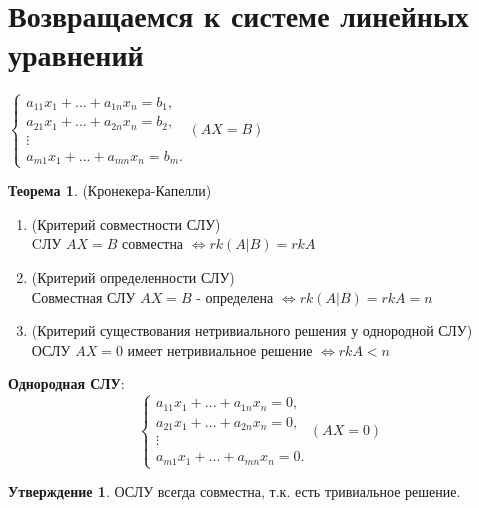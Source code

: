 \documentclass[a4paper, 12pt]{article}
\theoremstyle{definition}
\newtheorem*{theorem}{Теорема}
\newtheorem*{subtheorem}{Утверждение}
\begin{document}
  \newpage
  
  \section{Возвращаемся к системе линейных уравнений}
  $\begin{cases}
    a_{11}x_1 + ... + a_{1n}x_n = b_1, \\ 
    a_{21}x_1 + ... + a_{2n}x_n = b_2, \\
    \vdots \\
    a_{m1}x_1 + ... + a_{mn}x_n = b_m.
  \end{cases} (AX = B)$
  \begin{theorem} (Кронекера-Капелли)
    \begin{enumerate}
      \item (Критерий совместности СЛУ) \\ CЛУ $AX = B$ совместна $\Longleftrightarrow rk(A|B) = rkA$ 
      \item (Критерий определенности СЛУ) \\ Совместная СЛУ $AX =B$ - определена $\Longleftrightarrow rk(A|B) = rkA = n$ 
      \item (Критерий существования нетривиального решения у однородной СЛУ) \\ ОСЛУ $AX = 0$ имеет нетривиальное решение $\Longleftrightarrow rkA<n$ 
    \end{enumerate}
  \end{theorem}
  \textbf{Однородная СЛУ}: 
  $$\begin{cases}
    a_{11}x_1 + ... + a_{1n}x_n = 0, \\ 
    a_{21}x_1 + ... + a_{2n}x_n = 0, \\
    \vdots \\
    a_{m1}x_1 + ... + a_{mn}x_n = 0.
  \end{cases} (AX = 0)$$
  \begin{subtheorem}
    ОСЛУ всегда совместна, т.к. есть тривиальное решение.
  \end{subtheorem} 
\end{document}
